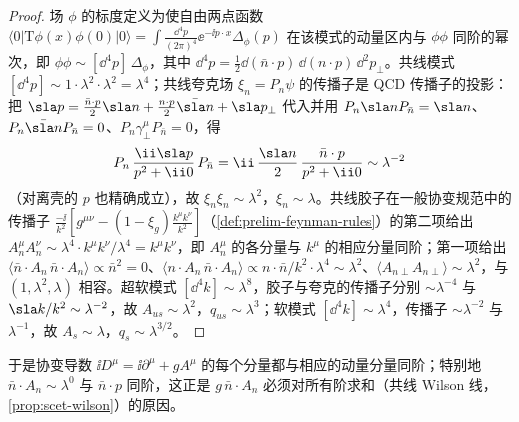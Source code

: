 \begin{proof}
场 $\phi$ 的标度定义为使自由两点函数 $\langle0|\mathrm T\phi(x)\phi(0)|0\rangle=\int\frac{\dd^4p}{(2\pi)^4}\ee^{-\ii p\cdot x}\Delta_\phi(p)$ 在该模式的动量区内与 $\phi\phi$ 同阶的幂次，即 $\phi\phi\sim[\dd^4p]\,\Delta_\phi$，其中 $\dd^4p=\frac12\dd(\bar n\cdot p)\,\dd(n\cdot p)\,\dd^2p_\perp$。共线模式 $[\dd^4p]\sim1\cdot\lambda^2\cdot\lambda^2=\lambda^4$；共线夸克场 $\xi_n=P_n\psi$ 的传播子是 QCD 传播子的投影：把 $\sla p=\frac{\bar n\cdot p}{2}\sla n+\frac{n\cdot p}{2}\bar{\sla n}+\sla p_\perp$ 代入并用 $P_n\sla nP_{\bar n}=\sla n$、$P_n\bar{\sla n}P_{\bar n}=0$、$P_n\gamma_\perp^\mu P_{\bar n}=0$，得
\begin{equation}\label{eq:scet-xiprop}
P_n\,\frac{\ii\sla p}{p^2+\ii0}\,P_{\bar n}=\ii\,\frac{\sla n}{2}\,\frac{\bar n\cdot p}{p^2+\ii0}\sim\lambda^{-2}
\end{equation}
（对离壳的 $p$ 也精确成立），故 $\xi_n\xi_n\sim\lambda^2$，$\xi_n\sim\lambda$。共线胶子在一般协变规范中的传播子 $\frac{-\ii}{k^2}[g^{\mu\nu}-(1-\xi_g)\frac{k^\mu k^\nu}{k^2}]$（\cref{def:prelim-feynman-rules}）的第二项给出 $A_n^\mu A_n^\nu\sim\lambda^4\cdot k^\mu k^\nu/\lambda^4=k^\mu k^\nu$，即 $A_n^\mu$ 的各分量与 $k^\mu$ 的相应分量同阶；第一项给出 $\langle\bar n\cdot A_n\,\bar n\cdot A_n\rangle\propto\bar n^2=0$、$\langle n\cdot A_n\,\bar n\cdot A_n\rangle\propto n\cdot\bar n/k^2\cdot\lambda^4\sim\lambda^2$、$\langle A_{n\perp}A_{n\perp}\rangle\sim\lambda^2$，与 $(1,\lambda^2,\lambda)$ 相容。超软模式 $[\dd^4k]\sim\lambda^8$，胶子与夸克的传播子分别 $\sim\lambda^{-4}$ 与 $\sla k/k^2\sim\lambda^{-2}$，故 $A_{us}\sim\lambda^2$，$q_{us}\sim\lambda^3$；软模式 $[\dd^4k]\sim\lambda^4$，传播子 $\sim\lambda^{-2}$ 与 $\lambda^{-1}$，故 $A_s\sim\lambda$，$q_s\sim\lambda^{3/2}$。
\end{proof}

于是协变导数 $\ii D^\mu=\ii\partial^\mu+gA^\mu$ 的每个分量都与相应的动量分量同阶；特别地 $\bar n\cdot A_n\sim\lambda^0$ 与 $\bar n\cdot p$ 同阶，这正是 $g\,\bar n\cdot A_n$ 必须对所有阶求和（共线 Wilson 线，\cref{prop:scet-wilson}）的原因。

